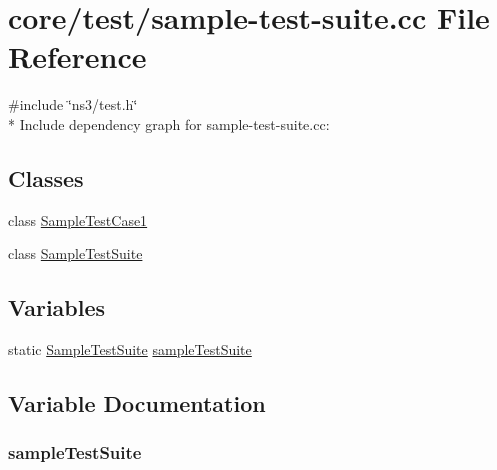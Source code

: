 \hypertarget{sample-test-suite_8cc}{}\section{core/test/sample-\/test-\/suite.cc File Reference}
\label{sample-test-suite_8cc}
{\ttfamily \#include \char`\"{}ns3/test.\+h\char`\"{}}\\*
Include dependency graph for sample-\/test-\/suite.cc\+:
\subsection*{Classes}
\begin{DoxyCompactItemize}
\item 
class \hyperlink{classSampleTestCase1}{Sample\+Test\+Case1}
\item 
class \hyperlink{classSampleTestSuite}{Sample\+Test\+Suite}
\end{DoxyCompactItemize}
\subsection*{Variables}
\begin{DoxyCompactItemize}
\item 
static \hyperlink{classSampleTestSuite}{Sample\+Test\+Suite} \hyperlink{sample-test-suite_8cc_aa31da7bf476c7982bdb20fc4d6b01388}{sample\+Test\+Suite}
\end{DoxyCompactItemize}


\subsection{Variable Documentation}
\subsubsection[{\texorpdfstring{sample\+Test\+Suite}{sampleTestSuite}}]{ sample\+Test\+Suite\hspace{0.3cm}{\ttfamily [static]}}\hypertarget{sample-test-suite_8cc_aa31da7bf476c7982bdb20fc4d6b01388}{}\label{sample-test-suite_8cc_aa31da7bf476c7982bdb20fc4d6b01388}
